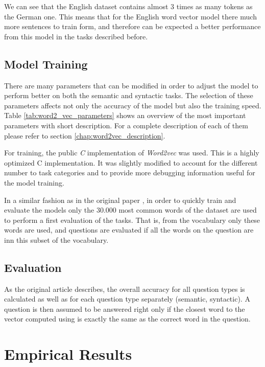   

We can see that the English dataset contains almost 3 times as many tokens as the
German one. This means that for the English word vector model  there much more
sentences to train form, and therefore can be expected a better performance
from this model in the tasks described before. 
   
\subsection{Model Training}
\label{experiments:sub:Training}

There are many parameters that can be modified in order to adjust the model
to  perform better on both the  semantic and syntactic tasks. The
selection of these  parameters affects not only the accuracy of the model but
also the training speed.  Table \ref{tab:word2_vec_parameters} shows an
overview of the most important parameters with short description. For a
complete description of each of them please refer to section \ref{chap:word2vec_description}.

For training,  the public \emph{C} implementation  of
\textit{Word2vec}  was
used.  This is a highly optimized C implementation. It was slightly modified to account for the different
number to task categories and to provide more debugging information useful
for the model training. 

In a similar fashion as in the original paper
\cite{DBLP:journals/corr/abs-1301-3781}, in order to quickly train and evaluate the models
only the 30.000 most common words of the dataset are used to perform a first
evaluation of the tasks. That is, from the vocabulary only these words are
used, and questions are evaluated if all the words on the question are inn
this subset of the vocabulary.

\subsection{Evaluation}
\label{experiments:sub:evaluation}

As  the original article describes, the overall accuracy for all question
types is calculated as well as  for each question type separately (semantic,
syntactic). A question is then assumed to be answered right  only if the
closest word to the vector computed using  is exactly the same as the correct word in the
question. 
 
\section{Empirical Results}
\label{sec:sub_empirical_results}

